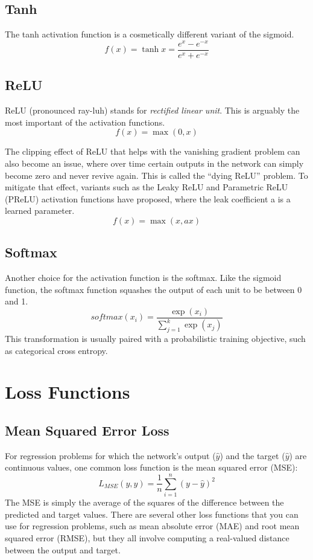\subsection{Tanh}
The tanh activation function is a cosmetically different variant of the sigmoid.
$$f(x)=\tanh x=\frac{e^x-e^{-x}}{e^x+e^{-x}}$$

\subsection{ReLU}
ReLU (pronounced ray-luh) stands for \textit{rectified linear unit}. This is arguably the most important of the activation functions.
$$f(x)=\max (0, x)$$

The clipping effect of ReLU that helps with the vanishing gradient problem can also
become an issue, where over time certain outputs in the network can simply become
zero and never revive again. This is called the “dying ReLU” problem. To mitigate
that effect, variants such as the Leaky ReLU and Parametric ReLU (PReLU) activation functions have proposed, where the leak coefficient a is a learned parameter.
$$f(x)=\max(x,ax)$$

\subsection{Softmax}
Another choice for the activation function is the softmax. Like the sigmoid function, the softmax function squashes the output of each unit to be between 0 and 1.
$$softmax(x_i)=\frac{\exp(x_i)}{\sum\limits_{j=1}^k\exp(x_j)}$$
This transformation is usually paired with a probabilistic training objective, such as categorical cross entropy.

\section{Loss Functions}
\subsection{Mean Squared Error Loss}
For regression problems for which the network's output ($\hat{y}$) and the target ($\hat{y}$) are continuous values, one common loss function is the mean squared error (MSE):
$$L_{MSE}(y,\hat{y})=\frac{1}{n}\sum_{i=1}^n(y-\hat{y})^2$$
The MSE is simply the average of the squares of the difference between the predicted and target values. There are several other loss functions that you can use for regression problems, such as mean absolute error (MAE) and root mean squared error (RMSE), but they all involve computing a real-valued distance between the output and target.
